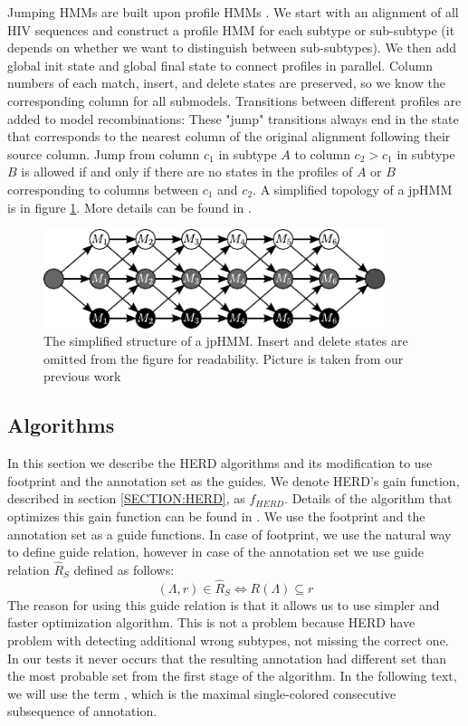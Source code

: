 Jumping HMMs are built upon profile HMMs \cite{Schultz2006}. We start with an
alignment of all HIV sequences and construct a profile HMM for each subtype or
sub-subtype (it depends on whether we want to distinguish between
sub-subtypes).  We then add global init state and global final state to connect
profiles in parallel.  Column numbers of each match, insert, and delete states
are preserved, so we know the corresponding column for all submodels.
Transitions between different profiles are added to model recombinations: These
"jump" transitions always end in the state that corresponds to the nearest
column of the original alignment following their source column. Jump from
column $c_1$ in subtype $A$ to column $c_2>c_1$ in subtype $B$ is allowed if
and only if there are no states in the profiles of $A$ or $B$ corresponding to columns
between $c_1$ and $c_2$. A simplified topology of a jpHMM is in figure
\ref{app:fig:jpHMM}. More details can be found in \cite{Schultz2006}.

\begin{figure}
\begin{center}
\includegraphics[width=10cm]{../figures/jumping_hmm}
\end{center}
\caption[Jumping HMM]{The simplified structure of a jpHMM. Insert and delete states
are omitted from the figure for readability. Picture is taken from our previous
work \cite{Nanasi2010mgr}}\label{app:fig:jpHMM}
\end{figure}

\subsection{Algorithms}

In this section we describe the HERD algorithms and its modification to use
footprint and the annotation set as the guides.  We denote HERD's gain
function, described in section \ref{SECTION:HERD}, as $f_{HERD}$.  Details of
the algorithm that optimizes this gain function can be found in
\cite{Nanasi2010, Nanasi2010mgr}. We use the footprint and the annotation set
as a guide functions. In case of footprint, we use the natural way to define
guide relation, however in case of the annotation set we use guide relation
$\hat{R}_S$ defined as follows: \[(\Lambda, r)\in \hat{R}_S\Leftrightarrow
R(\Lambda)\subseteq r\] The reason for using this guide relation is that it
allows us to use simpler and faster optimization algorithm. This is not a
problem because HERD have problem with detecting additional wrong subtypes, not
missing the correct one.  In our tests it never occurs that the resulting
annotation had different set than the most probable set from the first stage of
the algorithm.  In the following text, we will use the term
, which is the maximal single-colored consecutive
subsequence of annotation.


